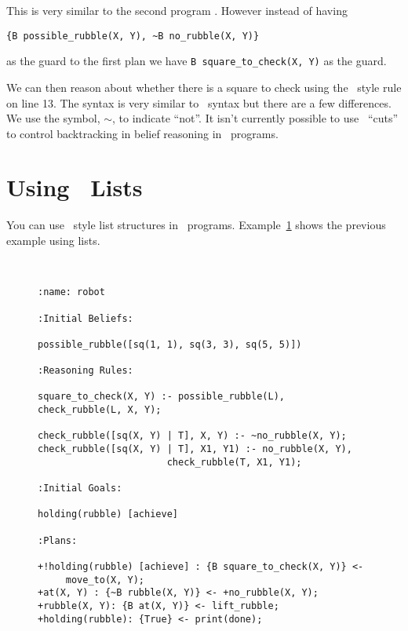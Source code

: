 This is very similar to the second program .  However instead of having 
\begin{verbatim}
{B possible_rubble(X, Y), ~B no_rubble(X, Y)}
\end{verbatim}as the guard to the first plan we have \lstinline{B square_to_check(X, Y)} as the guard.

We can then reason about whether there is a square to check using the \prolog\ style rule on line 13.  The syntax is very similar to \prolog\ syntax but there are a few differences.  We use the symbol, $\sim$, to indicate ``not''.  It isn't currently possible to use \prolog\ ``cuts'' to control backtracking in belief reasoning in \gwendolen\ programs.

\section{Using \prolog\ Lists}
You can use \prolog\ style list structures in \gwendolen\ programs.  Example~\ref{code:pickuprubble_list} shows the previous example using lists.
\begin{figure}[htb]
\begin{ourexample}
\label{code:pickuprubble_list} \quad \\
\begin{lstlisting}[basicstyle=\sffamily,style=easslisting,language=Gwendolen]
:name: robot

:Initial Beliefs:

possible_rubble([sq(1, 1), sq(3, 3), sq(5, 5)])

:Reasoning Rules:

square_to_check(X, Y) :- possible_rubble(L), check_rubble(L, X, Y);

check_rubble([sq(X, Y) | T], X, Y) :- ~no_rubble(X, Y);
check_rubble([sq(X, Y) | T], X1, Y1) :- no_rubble(X, Y), 
                       check_rubble(T, X1, Y1);

:Initial Goals:

holding(rubble) [achieve]

:Plans:

+!holding(rubble) [achieve] : {B square_to_check(X, Y)} <-
     move_to(X, Y);
+at(X, Y) : {~B rubble(X, Y)} <- +no_rubble(X, Y);
+rubble(X, Y): {B at(X, Y)} <- lift_rubble;
+holding(rubble): {True} <- print(done);
\end{lstlisting}
\end{ourexample}
\end{figure}

